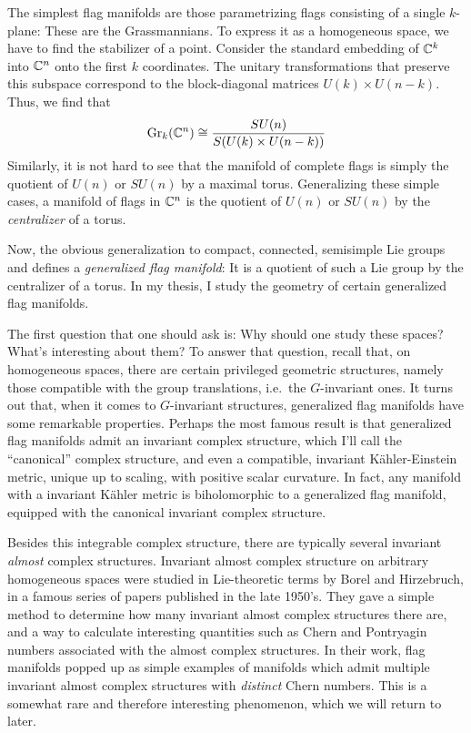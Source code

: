 \documentclass[parskip=half]{scrartcl}
\begin{document}
The simplest flag manifolds are those parametrizing flags consisting of a single $k$-plane: These are the Grassmannians. To express it as a homogeneous space, we have to find the stabilizer of a point. Consider the standard embedding of $\mathbb{C}^k$ into $\mathbb{C}^n$ onto the first $k$ coordinates. The unitary transformations that preserve this subspace correspond to the block-diagonal matrices $U(k)\times U(n-k)$. Thus, we find that 
\begin{equation*}
	\operatorname{Gr}_k(\mathbb{C}^n)\cong \frac{SU(n)}{S(U(k)\times U(n-k))}
\end{equation*}
Similarly, it is not hard to see that the manifold of complete flags is simply the quotient of $U(n)$ or $SU(n)$ by a maximal torus. Generalizing these simple cases, a manifold of flags in $\mathbb{C}^n$ is the quotient of $U(n)$ or $SU(n)$ by the \emph{centralizer} of a torus.

Now, the obvious generalization to compact, connected, semisimple Lie groups and defines a \emph{generalized flag manifold}: It is a quotient of such a Lie group by the centralizer of a torus. In my thesis, I study the geometry of certain generalized flag manifolds. 

The first question that one should ask is: Why should one study these spaces? What's interesting about them? To answer that question, recall that, on homogeneous spaces, there are certain privileged geometric structures, namely those compatible with the group translations, i.e.~the $G$-invariant ones. It turns out that, when it comes to $G$-invariant structures, generalized flag manifolds have some remarkable properties. Perhaps the most famous result is that generalized flag manifolds admit an invariant complex structure, which I'll call the ``canonical'' complex structure, and even a compatible, invariant  K\"ahler-Einstein metric, unique up to scaling, with positive scalar curvature. In fact, any manifold with a invariant K\"ahler metric is biholomorphic to a generalized flag manifold, equipped with the canonical invariant complex structure.

Besides this integrable complex structure, there are typically several invariant \emph{almost} complex structures. Invariant almost complex structure on arbitrary homogeneous spaces were studied in Lie-theoretic terms by Borel and Hirzebruch, in a famous series of papers published in the late 1950's. They gave a simple method to determine how many invariant almost complex structures there are, and a way to calculate interesting quantities such as Chern and Pontryagin numbers associated with the almost complex structures. In their work, flag manifolds popped up as simple examples of manifolds which admit multiple invariant almost complex structures with \emph{distinct} Chern numbers. This is a somewhat rare and therefore interesting phenomenon, which we will return to later.
\end{document}
